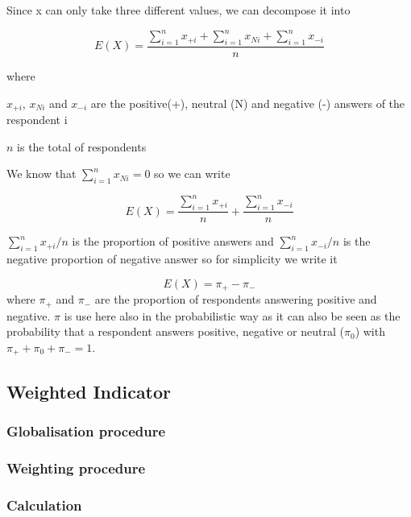 \documentclass[12pt,a4paper,oneside]{book}
\begin{document}
Since x can only take three different values, we can decompose it into 

\begin{equation}
    E(X) = \frac{ \sum_{i=1}^n x_{+i} + \sum_{i=1}^n x_{Ni} + \sum_{i=1}^n x_{-i}}{n}
\end{equation} 

where 

$x_{+i}$, $x_{Ni}$ and $x_{-i}$ are the positive(+), neutral (N) and negative (-) answers of the respondent i

$n$ is the total of respondents

We know that $\sum_{i=1}^n x_{Ni} = 0$ so we can write

\begin{equation}
    E(X) = \frac{\sum_{i=1}^n x_{+i}}{n}  + \frac{\sum_{i=1}^n x_{-i}}{n}
\end{equation} 

${\sum_{i=1}^n x_{+i}}/{n}$ is the proportion of positive answers and ${\sum_{i=1}^n x_{-i}}/{n}$ is the negative proportion of negative answer so for simplicity we write it 

\begin{equation}
    E(X) = \pi_+ - \pi_-
\end{equation}
where $\pi_+$ and $\pi_-$ are the proportion of respondents answering positive and negative. $\pi$ is use here also in the probabilistic way as it can also be seen as the probability that a respondent answers positive, negative or neutral ($\pi_0$) with $\pi_+ + \pi_0 + \pi_- =1$.


\newpage

\subsection{Weighted Indicator}

\subsubsection{Globalisation procedure}

\subsubsection{Weighting procedure}

\subsubsection{Calculation}
\end{document}

